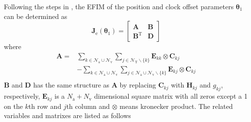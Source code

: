 \documentclass{IEEEtran}
\begin{document}
Following the steps in  \cite{SheWymWin:J10}, the EFIM of the position and clock offset parameters $\boldsymbol{\theta}_1$ can be determined as
\begin{equation}\label{eq88}
\mathbf{J}_{\text{e}}(\boldsymbol{\theta}_1)=
\begin{bmatrix}
  \mathbf{A}&\mathbf{B}\\
  \mathbf{B}^{\text{T}}&\mathbf{D}
\end{bmatrix}
\end{equation}
where
\begin{equation}\label{eq4}
\begin{aligned}
\mathbf{A}=&\sum_{k\in \mathcal{N}_{\text{a}}\cup\mathcal{N}_{\text{v}}} \sum_{j \in\mathcal{N}_{\text{T}}\backslash \{k\}} \mathbf{E}_{kk}\otimes \mathbf{C}_{kj}\\
&- \sum_{k\in \mathcal{N}_{\text{a}}\cup\mathcal{N}_{\text{v}}} \sum_{j \in \mathcal{N}_{\text{a}}\cup\mathcal{N}_{\text{v}}\backslash \{k\}} \mathbf{E}_{kj}\otimes \mathbf{C}_{kj}\\
\end{aligned}
\end{equation}
$\mathbf{B}$ and $\mathbf{D}$ has the same structure as $\mathbf{A}$ by replacing $\mathbf{C}_{kj}$ with $\mathbf{H}_{kj}$ and $g_{kj}$, respectively,
$\mathbf{E}_{kj}$ is a $N_{\text{a}}+N_{\text{v}}$ dimensional square matrix with all zeros except a 1 on the $k$th row and $j$th column and $\otimes$ means kronecker product.
The related variables and matrixes are listed as follows
\end{document}
